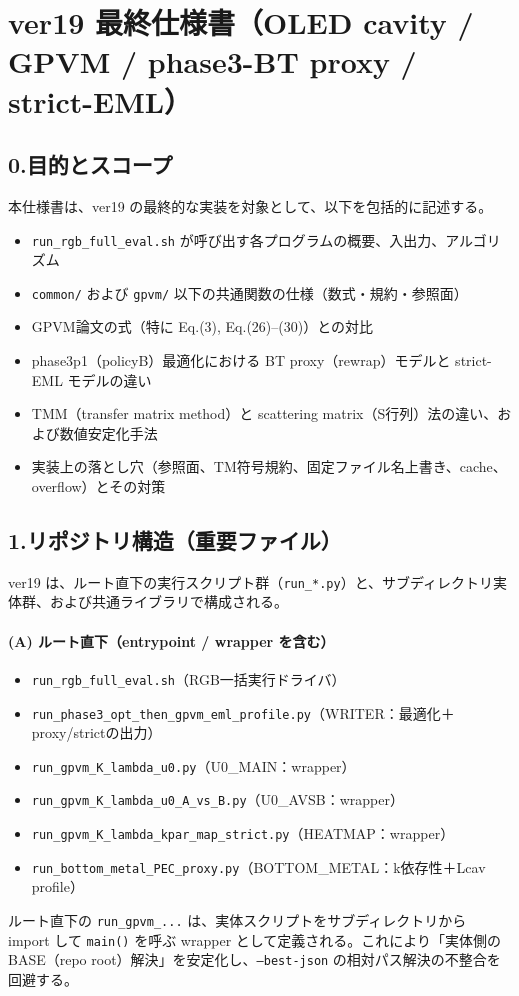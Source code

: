 \documentclass[a4paper,11pt]{jsarticle} %
\begin{document}

\section*{ver19 最終仕様書（OLED cavity / GPVM / phase3-BT proxy / strict-EML）}

\subsection*{0.\;目的とスコープ}
本仕様書は、ver19 の最終的な実装を対象として、以下を包括的に記述する。
\begin{itemize}
\item \texttt{run\_rgb\_full\_eval.sh} が呼び出す各プログラムの概要、入出力、アルゴリズム
\item \texttt{common/} および \texttt{gpvm/} 以下の共通関数の仕様（数式・規約・参照面）
\item GPVM論文の式（特に Eq.(3), Eq.(26)--(30)）との対比
\item phase3p1（policyB）最適化における BT proxy（rewrap）モデルと strict-EML モデルの違い
\item TMM（transfer matrix method）と scattering matrix（S行列）法の違い、および数値安定化手法
\item 実装上の落とし穴（参照面、TM符号規約、固定ファイル名上書き、cache、overflow）とその対策
\end{itemize}

\subsection*{1.\;リポジトリ構造（重要ファイル）}
ver19 は、ルート直下の実行スクリプト群（\texttt{run\_*.py}）と、サブディレクトリ実体群、および共通ライブラリで構成される。

\paragraph{(A) ルート直下（entrypoint / wrapper を含む）}
\begin{itemize}
\item \texttt{run\_rgb\_full\_eval.sh}（RGB一括実行ドライバ）
\item \texttt{run\_phase3\_opt\_then\_gpvm\_eml\_profile.py}（WRITER：最適化＋proxy/strictの出力）
\item \texttt{run\_gpvm\_K\_lambda\_u0.py}（U0\_MAIN：wrapper）
\item \texttt{run\_gpvm\_K\_lambda\_u0\_A\_vs\_B.py}（U0\_AVSB：wrapper）
\item \texttt{run\_gpvm\_K\_lambda\_kpar\_map\_strict.py}（HEATMAP：wrapper）
\item \texttt{run\_bottom\_metal\_PEC\_proxy.py}（BOTTOM\_METAL：k依存性＋Lcav profile）
\end{itemize}
ルート直下の \texttt{run\_gpvm\_...} は、実体スクリプトをサブディレクトリから import して \texttt{main()} を呼ぶ wrapper として定義される。これにより「実体側の BASE（repo root）解決」を安定化し、\texttt{--best-json} の相対パス解決の不整合を回避する。
\end{document}
